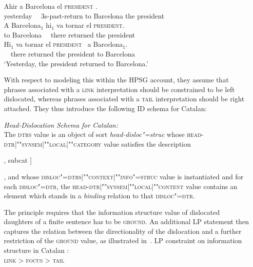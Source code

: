 \documentclass[output=paper]{langsci/langscibook}
\begin{document}
\begin{exe}
  \ex\label{ex:catalan}
  \begin{xlist}
    \ex\gll Ahir  a Barcelona el \textsc{president} \RF.\\
         yesterday \ \ 3s-past-return to Barcelona the president\\
   \ex\gll  A Barcelona$_1$ \LF hi$_1$ {va tornar} el \textsc{president}\RF.\\
           to Barcelona \ \  there returned the president\\\label{ex:catalan-a}
           \ex\gll \LF Hi$_1$ {va tornar} el \textsc{president}\RF\ {} a Barcelona$_1$.\\
            \ \  there  returned the president to Barcelona\\\label{ex:catalan-b}
\trans `Yesterday, the president returned to Barcelona.'
  \end{xlist}
\end{exe}
 
With respect to modeling this within the HPSG account, they assume
that phrases associated with a \textsc{link} interpretation should be
constrained to be left dislocated, whereas phrases associated with a
\textsc{tail} interpretation should be right attached.
They thus introduce the following ID schema for Catalan:
\begin{sloppy}
\begin{exe}
\ex  \textit{Head-Dislocation Schema for Catalan:}\\
  The \textsc{dtrs} value is an object of sort
  \textit{head-disloc"=struc} whose
  \textsc{head-dtr|""syn\-sem|""local|""category} value satisfies the
  description\\
  \begin{avm} [head \type{verb} [vform \type{finite}], subcat \elst]
  \end{avm}, and whose
  \textsc{disloc"=dtrs|""context|""info"=struc} value is instantiated and
  for each \textsc{disloc"=dtr}, the
  \textsc{head-dtr|""synsem|""local|""content} value contains an element
  which stands in a \textit{binding} relation to that
  \textsc{disloc"=dtr}.
\end{exe}
\end{sloppy}

The principle requires that the information structure value of
dislocated daughters of a finite sentence has to be
\textsc{ground}. An additional LP statement then captures the relation
between the directionality of the dislocation and a further
restriction of the \textsc{ground} value, as illustrated in~.
\ea
LP constraint on information structure in Catalan  \citep{EV96a}:\\
  \centering
  \textsc{link} > \textsc{focus} > \textsc{tail}
\end{document}
